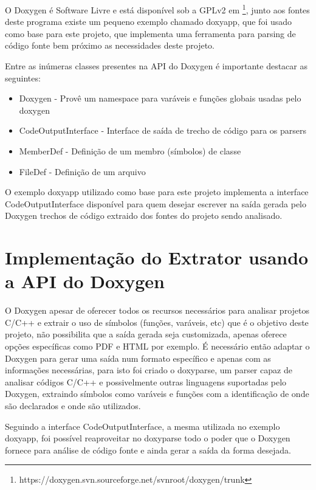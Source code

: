 O Doxygen é Software Livre e está disponível sob a GPLv2 em
\footnote{https://doxygen.svn.sourceforge.net/svnroot/doxygen/trunk}, junto aos
fontes deste programa existe um pequeno exemplo chamado doxyapp, que foi usado
como base para este projeto, que implementa uma ferramenta para parsing de
código fonte bem próximo as necessidades deste projeto.

Entre as inúmeras classes presentes na API do Doxygen é importante destacar as
seguintes:

\begin{itemize}
\item Doxygen - Provê um namespace para varáveis e funções globais usadas pelo
doxygen
\item CodeOutputInterface - Interface de saída de trecho de código para os
parsers
\item MemberDef - Definição de um membro (símbolos) de classe
\item FileDef - Definição de um arquivo
\end{itemize}

O exemplo doxyapp utilizado como base para este projeto implementa a interface CodeOutputInterface disponível para
quem desejar escrever na saída gerada pelo Doxygen trechos de código extraido
dos fontes do projeto sendo analisado.

\section{Implementação do Extrator usando a API do Doxygen}

O Doxygen apesar de oferecer todos os recursos necessários para
analisar projetos C/C++ e extrair o uso de símbolos (funções, varáveis, etc)
que é o objetivo deste projeto, não possibilita que a saída gerada seja
customizada, apenas oferece opções específicas como PDF e HTML por exemplo. É
necessário então adaptar o Doxygen para gerar uma saída num formato
específico e apenas com as informações necessárias, para isto foi criado o
doxyparse, um parser capaz de analisar códigos C/C++ e possivelmente outras
linguagens suportadas pelo Doxygen, extraindo símbolos como varáveis e funções
com a identificação de onde são declarados e onde são utilizados.

Seguindo a interface CodeOutputInterface, a mesma utilizada no exemplo doxyapp,
foi possível reaproveitar no doxyparse todo o poder que o Doxygen fornece para
análise de código fonte e ainda gerar a saída da forma desejada.


